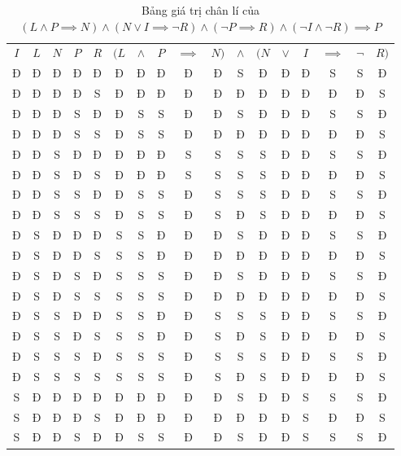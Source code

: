 \begin{table}[H]
    \centering
	\caption{Bảng giá trị chân lí của $( L \land P \implies N ) \land ( N \lor I \implies \neg R ) \land ( \neg P \implies R ) \land ( \neg I \land \neg R ) \implies P$}
    \label{ex:nen_tang_lo_gich:giai_tich_menh_de:lap_luan:bai_2_phan_4}
	\begin{tabular}{|c|c|c|c|c|cccccccccccc|}
		\hline
		$I$ & $L$ & $N$ & $P$ & $R$ & $(L$ & $\land$ & $P$ & $\implies$ & $N)$ & $\land$ & $(N$ & $\lor$ & $I$ & $\implies$ & $\neg$ & $R)$ \\
		\headerDivider
		Đ & Đ & Đ & Đ & Đ & Đ & Đ & Đ & Đ & Đ & S & Đ & Đ & Đ & S & S & Đ \\
		Đ & Đ & Đ & Đ & S & Đ & Đ & Đ & Đ & Đ & Đ & Đ & Đ & Đ & Đ & Đ & S \\
		Đ & Đ & Đ & S & Đ & Đ & S & S & Đ & Đ & S & Đ & Đ & Đ & S & S & Đ \\
		Đ & Đ & Đ & S & S & Đ & S & S & Đ & Đ & Đ & Đ & Đ & Đ & Đ & Đ & S \\
		Đ & Đ & S & Đ & Đ & Đ & Đ & Đ & S & S & S & S & Đ & Đ & S & S & Đ \\
		Đ & Đ & S & Đ & S & Đ & Đ & Đ & S & S & S & S & Đ & Đ & Đ & Đ & S \\
		Đ & Đ & S & S & Đ & Đ & S & S & Đ & S & S & S & Đ & Đ & S & S & Đ \\
		Đ & Đ & S & S & S & Đ & S & S & Đ & S & Đ & S & Đ & Đ & Đ & Đ & S \\
		Đ & S & Đ & Đ & Đ & S & S & Đ & Đ & Đ & S & Đ & Đ & Đ & S & S & Đ \\
		Đ & S & Đ & Đ & S & S & S & Đ & Đ & Đ & Đ & Đ & Đ & Đ & Đ & Đ & S \\
		Đ & S & Đ & S & Đ & S & S & S & Đ & Đ & S & Đ & Đ & Đ & S & S & Đ \\
		Đ & S & Đ & S & S & S & S & S & Đ & Đ & Đ & Đ & Đ & Đ & Đ & Đ & S \\
		Đ & S & S & Đ & Đ & S & S & Đ & Đ & S & S & S & Đ & Đ & S & S & Đ \\
		Đ & S & S & Đ & S & S & S & Đ & Đ & S & Đ & S & Đ & Đ & Đ & Đ & S \\
		Đ & S & S & S & Đ & S & S & S & Đ & S & S & S & Đ & Đ & S & S & Đ \\
		Đ & S & S & S & S & S & S & S & Đ & S & Đ & S & Đ & Đ & Đ & Đ & S \\
		S & Đ & Đ & Đ & Đ & Đ & Đ & Đ & Đ & Đ & S & Đ & Đ & S & S & S & Đ \\
		S & Đ & Đ & Đ & S & Đ & Đ & Đ & Đ & Đ & Đ & Đ & Đ & S & Đ & Đ & S \\
		S & Đ & Đ & S & Đ & Đ & S & S & Đ & Đ & S & Đ & Đ & S & S & S & Đ \\

\end{tabular}
\end{table}
